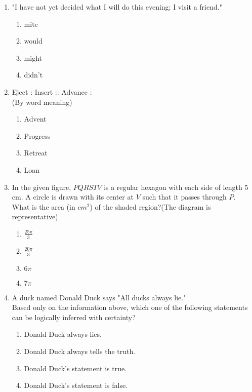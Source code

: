 \documentclass[journal,12pt,onecolumn]{IEEEtran}
\theoremstyle{remark}
\begin{document}
\begin{enumerate}
    \item "I have not yet decided what I will do this evening; I {\underline{\hspace{2cm}}}visit a friend."
    \begin{enumerate}
        \item mite
        \item would
        \item might
        \item didn't
    \end{enumerate}
    \item Eject : Insert :: Advance :\\
    (By word meaning)
    \begin{enumerate}
        \item Advent
        \item Progress
        \item Retreat
        \item Loan
    \end{enumerate}
    \item In the given figure, $PQRSTV$ is a regular hexagon with each side of length $5$ cm. A circle is drawn with its center at $V$ such that it passes through $P$. What is the area (in $cm^2$) of the shaded region?(The diagram is representative)
    \begin{enumerate}
        \item $\frac{25\pi}{3}$
        \item $\frac{20\pi}{3}$
        \item $6\pi$
        \item $7\pi$
    \end{enumerate}
    \begin{figure}[H]
        \centering
          
    \end{figure}
    \item A duck named Donald Duck says "All ducks always lie." \\
    Based only on the information above, which one of the following statements can be logically inferred with certainty?
    \begin{enumerate}
        \item Donald Duck always lies.
        \item Donald Duck always tells the truth.
        \item Donald Duck's statement is true.
        \item Donald Duck's statement is false.

\end{enumerate}
\end{enumerate}
\end{document}
